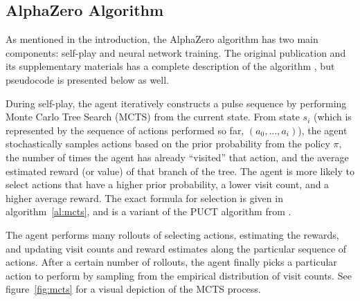 \subsection{AlphaZero Algorithm}

As mentioned in the introduction, the AlphaZero algorithm has two main components: self-play and neural network training. The original publication and its supplementary materials has a complete description of the algorithm \cite{Silver1140}, but pseudocode is presented below as well.

During self-play, the agent iteratively constructs a pulse sequence by performing Monte Carlo Tree Search (MCTS) from the current state. From state $s_i$ (which is represented by the sequence of actions performed so far, $(a_0, \dots, a_i)$), the agent stochastically samples actions based on the prior probability from the policy $\pi$, the number of times the agent has already ``visited'' that action, and the average estimated reward (or value) of that branch of the tree. The agent is more likely to select actions that have a higher prior probability, a lower visit count, and a higher average reward. The exact formula for selection is given in algorithm~\ref{al:mcts},
and is a variant of the PUCT algorithm from \cite{Rosin:2011uu}.

The agent performs many rollouts of selecting actions, estimating the rewards, and updating visit counts and reward estimates along the particular sequence of actions. After a certain number of rollouts, the agent finally picks a particular action to perform by sampling from the empirical distribution of visit counts.
See figure~\ref{fig:mcts} for a visual depiction of the MCTS process.

